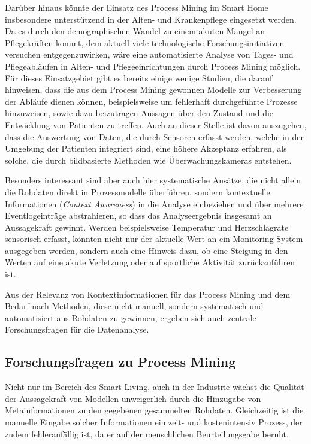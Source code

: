 Darüber hinaus könnte der Einsatz des Process Mining im Smart Home insbesondere unterstützend in der Alten- und Krankenpflege eingesetzt werden. Da es durch den demographischen Wandel zu einem akuten Mangel an Pflegekräften kommt, dem aktuell viele technologische Forschungsinitiativen versuchen entgegenzuwirken, wäre eine automatisierte Analyse von Tages- und Pflegeabläufen in Alten- und Pflegeeinrichtungen durch Process Mining möglich. Für dieses Einsatzgebiet gibt es bereits einige wenige Studien, die darauf hinweisen, dass die aus dem Process Mining gewonnen Modelle zur Verbesserung der Abläufe dienen können, beispielsweise um fehlerhaft durchgeführte Prozesse hinzuweisen, sowie dazu beizutragen Aussagen über den Zustand und die Entwicklung von Patienten zu treffen. Auch an dieser Stelle ist davon auszugehen, dass die Auswertung von Daten, die durch Sensoren erfasst werden, welche in der Umgebung der Patienten integriert sind, eine höhere Akzeptanz erfahren, als solche, die durch bildbasierte Methoden wie Überwachungskameras entstehen.

Besonders interessant sind aber auch hier systematische Ansätze, die nicht allein die Rohdaten direkt in Prozessmodelle überführen, sondern kontextuelle Informationen (\textit{Context Awareness}) in die Analyse einbeziehen und über mehrere Eventlogeinträge abstrahieren, so dass das Analyseergebnis insgesamt an Aussagekraft gewinnt.
Werden beispielsweise Temperatur und Herzschlagrate sensorisch erfasst, könnten nicht nur der aktuelle Wert an ein Monitoring System ausgegeben werden, sondern auch eine Hinweis dazu, ob eine Steigung in den Werten auf eine akute Verletzung oder auf sportliche Aktivität zurückzuführen ist.

Aus der Relevanz von Kontextinformationen für das Process Mining und dem Bedarf nach Methoden, diese nicht manuell, sondern systematisch und automatisiert aus Rohdaten zu gewinnen, ergeben sich auch zentrale Forschungsfragen für die Datenanalyse.

\subsection{Forschungsfragen zu Process Mining}
Nicht nur im Bereich des Smart Living, auch in der Industrie wächst die Qualität der Aussagekraft von Modellen unweigerlich durch die Hinzugabe von Metainformationen zu den gegebenen gesammelten Rohdaten. Gleichzeitig ist die manuelle Eingabe solcher Informationen ein zeit- und kostenintensiv Prozess, der zudem fehleranfällig ist, da er auf der menschlichen Beurteilungsgabe beruht.

